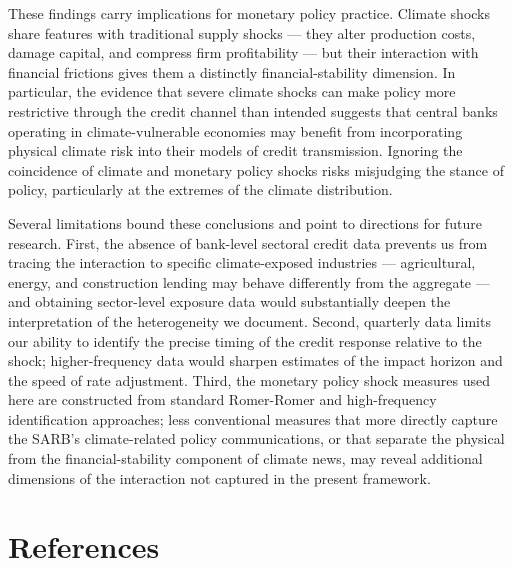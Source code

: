 \documentclass[
  letterpaper,
  DIV=11,
  numbers=noendperiod]{scrartcl}
\let\oldsection\section
\renewcommand\section{\oldsection}
\begin{document}
These findings carry implications for monetary policy practice. Climate
shocks share features with traditional supply shocks --- they alter
production costs, damage capital, and compress firm profitability ---
but their interaction with financial frictions gives them a distinctly
financial-stability dimension. In particular, the evidence that severe
climate shocks can make policy more restrictive through the credit
channel than intended suggests that central banks operating in
climate-vulnerable economies may benefit from incorporating physical
climate risk into their models of credit transmission. Ignoring the
coincidence of climate and monetary policy shocks risks misjudging the
stance of policy, particularly at the extremes of the climate
distribution.

Several limitations bound these conclusions and point to directions for
future research. First, the absence of bank-level sectoral credit data
prevents us from tracing the interaction to specific climate-exposed
industries --- agricultural, energy, and construction lending may behave
differently from the aggregate --- and obtaining sector-level exposure
data would substantially deepen the interpretation of the heterogeneity
we document. Second, quarterly data limits our ability to identify the
precise timing of the credit response relative to the shock;
higher-frequency data would sharpen estimates of the impact horizon and
the speed of rate adjustment. Third, the monetary policy shock measures
used here are constructed from standard Romer-Romer and high-frequency
identification approaches; less conventional measures that more directly
capture the SARB's climate-related policy communications, or that
separate the physical from the financial-stability component of climate
news, may reveal additional dimensions of the interaction not captured
in the present framework.

\newpage

\section*{References}\label{references}

\renewcommand{\bibsection}{}


\setcounter{section}{0}
\renewcommand{\thesection}{\Alph{section}}

\setcounter{table}{0}
\renewcommand{\thetable}{A\arabic{table}}

\setcounter{figure}{0}
\renewcommand{\thefigure}{A\arabic{figure}}
\end{document}
